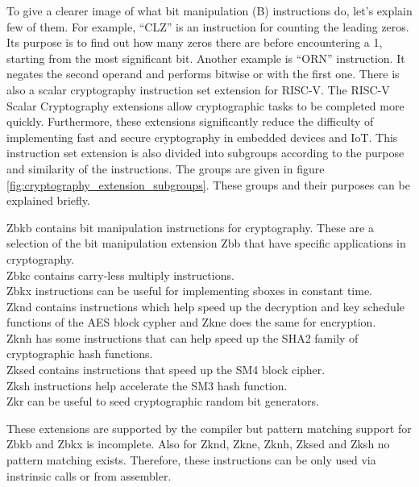 To give a clearer image of what bit manipulation (B) instructions do, let’s explain few of them. For example, “CLZ” is an instruction for counting the leading zeros. Its purpose is to find out how many zeros there are before encountering a 1, starting from the most significant bit. Another example is “ORN” instruction. It negates the second operand and performs bitwise or with the first one. 
There is also a scalar cryptography instruction set extension for RISC-V. The RISC-V Scalar Cryptography extensions allow cryptographic tasks to be completed more quickly. Furthermore, these extensions significantly reduce the difficulty of implementing fast and secure cryptography in embedded devices and IoT. \cite{cryptogroups} This instruction set extension is also divided into subgroups according to the purpose and similarity of the instructions. The groups are given in figure \ref{fig:cryptography_extension_subgroups}. These groups and their purposes can be explained briefly.

Zbkb contains bit manipulation instructions for cryptography. These are a selection of the bit manipulation extension Zbb that have specific applications in cryptography. \\
Zbkc contains carry-less multiply instructions.\\
Zbkx instructions can be useful for implementing sboxes in constant time.\\
Zknd contains instructions which help speed up the decryption and key schedule functions of the AES block cypher and Zkne does the same for encryption.\\
Zknh has some instructions that can help speed up the SHA2 family of cryptographic hash functions.\\
Zksed contains instructions that speed up the SM4 block cipher.\\
Zksh instructions help accelerate the SM3 hash function.\\
Zkr can be useful to seed cryptographic random bit generators.\cite{cryptoextensiondoc}

These extensions are supported by the compiler but pattern matching support for Zbkb and Zbkx is incomplete. Also for Zknd, Zkne, Zknh, Zksed and Zksh no pattern matching exists. Therefore, these instructions can be only used via instrinsic calls or from assembler.\cite{llvmextensionspage}

